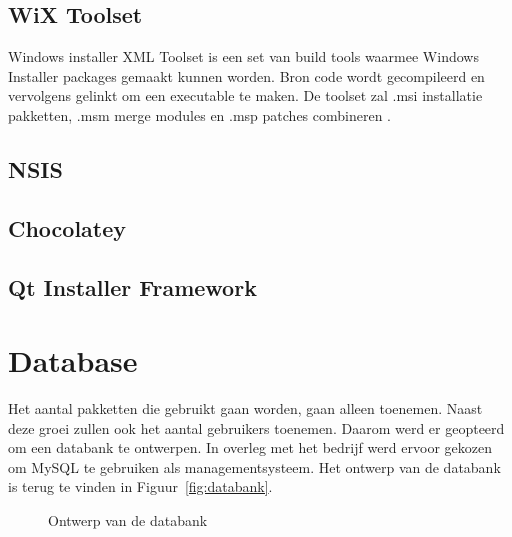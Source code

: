 \subsection{WiX Toolset}
Windows installer XML Toolset is een set van build tools waarmee Windows Installer packages gemaakt kunnen worden.
Bron code wordt gecompileerd en vervolgens gelinkt om een executable te maken.
De toolset zal .msi installatie pakketten, .msm merge modules en .msp patches combineren \citep{wixToolset}.


\subsection{NSIS}


\subsection{Chocolatey}


\subsection{Qt Installer Framework}


\section{Database}
Het aantal pakketten die gebruikt gaan worden, gaan alleen toenemen.
Naast deze groei zullen ook het aantal gebruikers toenemen.
Daarom werd er geopteerd om een databank te ontwerpen.
In overleg met het bedrijf werd ervoor gekozen om MySQL te gebruiken als managementsysteem.
Het ontwerp van de databank is terug te vinden in Figuur~\vref{fig:databank}.

\begin{figure}[h!]
\centering
{}
\caption{Ontwerp van de databank}
\label{fig:databank}
\end{figure}

